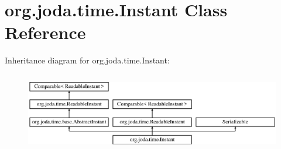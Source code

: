 \hypertarget{classorg_1_1joda_1_1time_1_1_instant}{\section{org.\-joda.\-time.\-Instant Class Reference}
\label{classorg_1_1joda_1_1time_1_1_instant}
}
Inheritance diagram for org.\-joda.\-time.\-Instant\-:\begin{figure}[H]
\begin{center}
\leavevmode
\includegraphics[height=3.538705cm]{classorg_1_1joda_1_1time_1_1_instant}
\end{center}
\end{figure}
